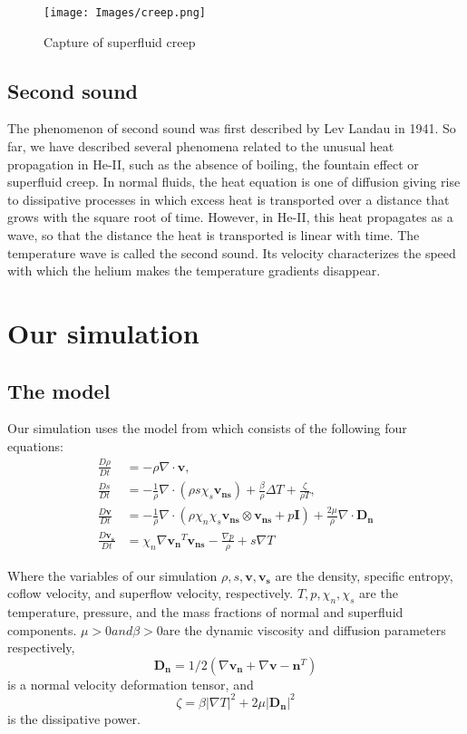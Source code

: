 \documentclass{article}
\begin{document}
\begin{figure}[H]
    \centering
    \texttt{[image: Images/creep.png]}
    \caption{Capture of superfluid creep}
    \label{fig:enter-label}
\end{figure}

\subsection{Second sound}

The phenomenon of second sound was first described by Lev Landau in 1941. \cite{LevLan}
So far, we have described several phenomena related to the unusual heat propagation in He-II, such as the absence of boiling, the fountain effect or superfluid creep. In normal fluids, the heat equation is one of diffusion giving rise to dissipative processes in which excess heat is transported over a distance that grows with the square root of time. However, in He-II, this heat propagates as a wave, so that the distance the heat is transported is linear with time. The temperature wave is called the second sound. Its velocity characterizes the speed with which the helium makes the temperature gradients disappear.\\


\section{Our simulation}
\subsection{The model}
Our simulation uses the model from\cite{Kincl} which consists of the following four equations:
\begin{align}
\frac{D\rho}{Dt} &= -\rho \nabla \cdot \mathbf{v}, \\
\frac{Ds}{Dt} &= -\frac{1}{\rho} \nabla \cdot (\rho s \chi_s \mathbf{v_{ns}}) + \frac{\beta}{\rho} \Delta T + \frac{\zeta}{\rho T} ,\\
\frac{D\mathbf{v}}{Dt} &= -\frac{1}{\rho} \nabla \cdot (\rho \chi_n \chi_s \mathbf{v_{ns}} \otimes \mathbf{v_{ns}} + p \mathbf{I}) + \frac{2 \mu}{\rho} \nabla \cdot \mathbf{D_n} \\
\frac{D\mathbf{v_s}}{Dt} &= \chi_n \nabla \mathbf{v_n}^T \mathbf{v_{ns}} - \frac{\nabla p}{\rho} + s \nabla T
\end{align}

Where the variables of our simulation  \(\rho, s, \mathbf{v}, \mathbf{v_s}\) are the density, specific entropy, coflow velocity, and superflow velocity, respectively.
\(T, p, \chi_n, \chi_s\) are the temperature, pressure, and the mass fractions of normal and superfluid components. 
\(\mu > 0 and \beta>0 \)are the dynamic viscosity and diffusion parameters respectively, 
\[\mathbf{D_n} = 1/2(\nabla \mathbf{v_n} +  \nabla \mathbf{v-n}^T)\] 
is a normal velocity deformation tensor, and
\[\zeta = \beta |\nabla T|^2 + 2 \mu |\mathbf{D_n}|^2\]
is the dissipative power.
\end{document}
